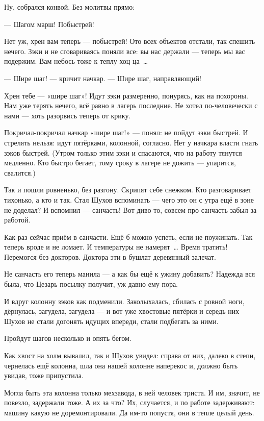 Ну, собрался конвой. Без молитвы прямо:

--- Шагом марш! Побыстрей!

Нет уж, хрен вам теперь --- побыстрей! Ото всех объектов отстали, так спешить нечего. Зэки и не 
сговариваясь поняли все: вы нас держали --- теперь мы вас подержим. Вам небось тоже к теплу 
хоц-ца~\dots{}

--- Шире шаг! --- кричит начкар. --- Шире шаг, направляющий!

Хрен тебе --- «шире шаг»! Идут зэки размеренно, понурясь, как на похороны. Нам уже терять 
нечего, всё равно в лагерь последние. Не хотел по-человечески с нами --- хоть разорвись теперь 
от крику.

Покричал-покричал начкар «шире шаг!» --- понял: не пойдут зэки быстрей. И стрелять нельзя: идут 
пятёрками, колонной, согласно. Нет у начкара власти гнать зэков быстрей. (Утром только этим 
зэки и спасаются, что на работу тянутся медленно. Кто быстро бегает, тому сроку в лагере не 
дожить --- упарится, свалится.)

Так и пошли ровненько, без разгону. Скрипят себе снежком. Кто разговаривает тихонько, а кто и 
так. Стал Шухов вспоминать --- чего это он с утра ещё в зоне не доделал? И вспомнил --- санчасть! 
Вот диво-то, совсем про санчасть забыл за работой.

Как раз сейчас приём в санчасти. Ещё б можно успеть, если не поужинать. Так теперь вроде и не 
ломает. И температуры не намерят~\dots{} Время тратить! Перемогся без докторов. Доктора эти в 
бушлат деревянный залечат.

Не санчасть его теперь манила --- а как бы ещё к ужину добавить? Надежда вся была, что Цезарь 
посылку получит, уж давно ему пора.

И вдруг колонну зэков как подменили. Заколыхалась, сбилась с ровной ноги, дёрнулась, 
загудела, загудела --- и вот уже хвостовые пятёрки и середь них Шухов не стали догонять идущих 
впереди, стали подбегать за ними.

Пройдут шагов несколько и опять бегом.

Как хвост на холм вывалил, так и Шухов увидел: справа от них, далеко в степи, чернелась ещё 
колонна, шла она нашей колонне наперекос и, должно быть увидав, тоже припустила.

Могла быть эта колонна только мехзавода, в ней человек триста. И им, значит, не повезло, 
задержали тоже. А их за что? Их, случается, и по работе задерживают: машину какую не 
доремонтировали. Да им-то попустя, они в тепле целый день.

